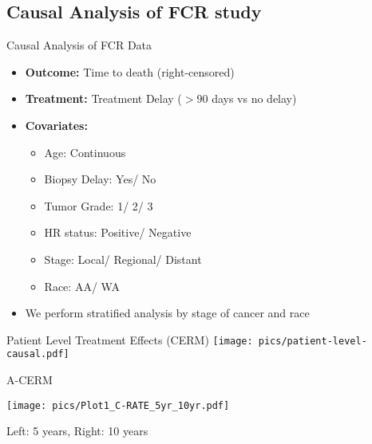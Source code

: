 \documentclass{beamer}
\begin{document}
\subsection{Causal Analysis of FCR study}
\begin{frame}{Causal Analysis of FCR Data}
    \begin{itemize}
      \vfill \item \textbf{Outcome:} Time to death (right-censored)
      \vfill \item \textbf{Treatment:} Treatment Delay (\(>90\) days vs no delay)
      \vfill \item \textbf{Covariates:}
      \begin{itemize}
        \vfill \item Age: Continuous
        \vfill \item Biopsy Delay: Yes/ No
        \vfill \item Tumor Grade: 1/ 2/ 3
        \vfill \item HR status: Positive/ Negative
        \vfill \item Stage: Local/ Regional/ Distant
        \vfill \item Race: AA/ WA
      
        
       
      \end{itemize}
      \vfill \item We perform stratified analysis by stage of cancer and race
    \end{itemize}

\end{frame}


\begin{frame}{Patient Level Treatment Effects (CERM)}
\texttt{[image: pics/patient-level-causal.pdf]}

    
\end{frame}



\begin{frame}{A-CERM}
   
       \texttt{[image: pics/Plot1\_C-RATE\_5yr\_10yr.pdf]}
  
    
    Left: 5 years, Right: 10 years
\end{frame}
\end{document}

